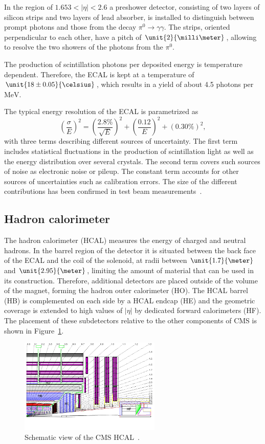 In the region of $1.653 < \vert \eta \vert < 2.6$ a preshower detector, consisting of two layers of silicon strips and two layers of lead absorber, is installed to distinguish between prompt photons and those from the decay $\pi^0 \rightarrow \gamma\gamma$. The strips, oriented perpendicular to each other, have a pitch of $\unit{2}{\milli\meter}$, allowing to resolve the two showers of the photons from the $\pi^0$. 

The production of scintillation photons per deposited energy is temperature dependent. Therefore, the ECAL is kept at a temperature of $\unit{18\pm0.05}{\celsius}$, which results in a yield of about 4.5 photons per $\mathrm{MeV}$. 

The typical energy resolution of the ECAL is parametrized as
\begin{equation}
\left(\frac{\sigma}{E}\right)^2 = \left( \frac{2.8\%}{\sqrt{E}}\right)^2 + \left( \frac{0.12}{E} \right)^2 + (0.30\%)^2,
\end{equation}
with three terms describing different sources of uncertainty. The first term includes statistical fluctuations in the production of scintillation light as well as the energy distribution over several crystals. The second term covers such sources of noise as electronic noise or pileup. The constant term accounts for other sources of uncertainties such as calibration errors. The size of the different contributions has been confirmed in test beam measurements~\cite{EGM-10-003}. 
\subsection{Hadron calorimeter}
The hadron calorimeter (HCAL) measures the energy of charged and neutral hadrons. In the barrel region of the detector it is situated between the back face of the ECAL and the coil of the solenoid, at radii between $\unit{1.7}{\meter}$ and $\unit{2.95}{\meter}$, limiting the amount of material that can be used in its construction. Therefore, additional detectors are placed outside of the volume of the magnet, forming the hadron outer calorimeter (HO). The HCAL barrel (HB) is complemented on each side by a HCAL endcap (HE) and the geometric coverage is extended to high values of $\vert \eta \vert$ by dedicated forward calorimeters (HF). The placement of these subdetectors relative to the other components of CMS is shown in Figure~\ref{fig:HCAL}.
\begin{figure}[htbp]
\centering
  \includegraphics[width=0.6\textwidth]{plots/CMS/HCAL.png}
\caption{Schematic view of the CMS HCAL~\cite{CMS}.}
\label{fig:HCAL}
\end{figure} 
